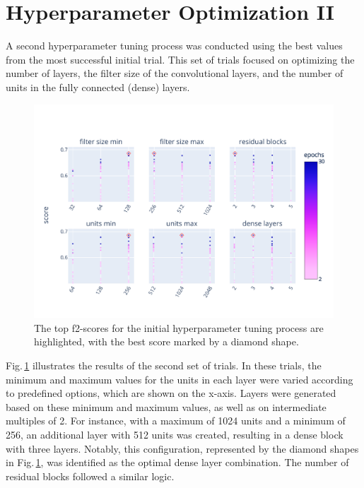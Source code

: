 \section{Hyperparameter Optimization II}

A second hyperparameter tuning process was conducted using the best values from the most successful initial trial. This set of trials focused on optimizing the number of layers, the filter size of the convolutional layers, and the number of units in the fully connected (dense) layers.

\begin{figure}[ht]
    \centering
    \includegraphics[width=0.9\linewidth, trim={10pt 10pt 15pt 40pt}, clip]{figures/figures_tuner/hyperband_resnet_followup_params.pdf}
    \caption{The top f2-scores for the initial hyperparameter tuning process are highlighted, with the best score marked by a diamond shape.}
    \label{fig:hyperband_resnet_followup_params}
\end{figure}

Fig.\,\ref{fig:hyperband_resnet_followup_params} illustrates the results of the second set of trials. In these trials, the minimum and maximum values for the units in each layer were varied according to predefined options, which are shown on the x-axis. Layers were generated based on these minimum and maximum values, as well as on intermediate multiples of 2. For instance, with a maximum of 1024 units and a minimum of 256, an additional layer with 512 units was created, resulting in a dense block with three layers. Notably, this configuration, represented by the diamond shapes in Fig.\,\ref{fig:hyperband_resnet_followup_params}, was identified as the optimal dense layer combination. The number of residual blocks followed a similar logic. 

